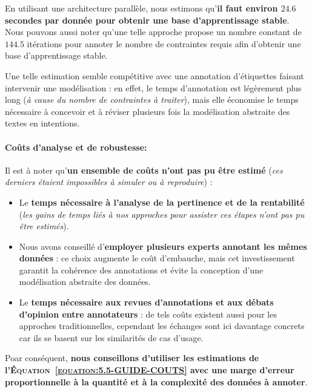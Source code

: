 			En utilisant une architecture parallèle, nous estimons qu'\textbf{il faut environ $24.6$ secondes par donnée pour obtenir une base d'apprentissage stable}.
			Nous pouvons aussi noter qu'une telle approche propose un nombre constant de $144.5$ itérations pour annoter le nombre de contraintes requis afin d'obtenir une base d'apprentissage stable.
			
			Une telle estimation semble compétitive avec une annotation d'étiquettes faisant intervenir une modélisation : en effet, le temps d'annotation est légèrement plus long (\textit{à cause du nombre de contraintes à traiter}), mais elle économise le temps nécessaire à concevoir et à réviser plusieurs fois la modélisation abstraite des textes en intentions.
		
		
		\paragraph{\textcolor{colorSilverLakeBlue}{\faCheckSquare} Coûts d'analyse et de robustesse:}
			
			Il est à noter qu'\textbf{un ensemble de coûts n'ont pas pu être estimé} (\textit{ces derniers étaient impossibles à simuler ou à reproduire}) :
			\begin{itemize}
				\item Le \textbf{temps nécessaire à l'analyse de la pertinence et de la rentabilité}
				(\textit{les gains de temps liés à nos approches pour assister ces étapes n'ont pas pu être estimés}).
				\item Nous avons conseillé d'\textbf{employer plusieurs experts annotant les mêmes données} : ce choix augmente le coût d'embauche, mais cet investissement garantit la cohérence des annotations et évite la conception d'une modélisation abstraite des données.
				\item Le \textbf{temps nécessaire aux revues d'annotations et aux débats d'opinion entre annotateurs} : de tels coûts existent aussi pour les approches traditionnelles, cependant les échanges sont ici davantage concrets car ils se basent sur les similarités de cas d'usage.
			\end{itemize}
			
			Poar conséquent, \textbf{nous conseillons d'utiliser les estimations de l'\textsc{Équation~\ref{equation:5.5-GUIDE-COUTS}} avec une marge d'erreur proportionnelle à la quantité et à la complexité des données à annoter}.
			
